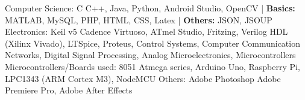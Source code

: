\begin{cvhonors}
  \cvhonor
    {Computer Science: \textmd{C}}
    {C++, Java, Python, Android Studio, OpenCV | \textbf{Basics:} MATLAB, MySQL, PHP, HTML, CSS, Latex | \textbf{Others:}  JSON, JSOUP}
    {}
    {}
  \cvhonor
    {Electronics:  \textmd{Keil v5}}
    {Cadence Virtuoso, ATmel Studio, Fritzing, Verilog HDL (Xilinx Vivado), LTSpice, Proteus, Control Systems, Computer Communication Networks, Digital Signal Processing, Analog Microelectronics, Microcontrollers}
    {}
     {}
     \cvhonor
    {Microcontrollers/Boards used:  \textmd{8051}}
    {Atmega series, Arduino Uno, Raspberry Pi, LPC1343 (ARM Cortex M3), NodeMCU}
    {}
     {}
     \cvhonor
    {Others: \textmd{Adobe Photoshop}}
    {Adobe Premiere Pro, Adobe After Effects}
    {}
    {}
\end{cvhonors}
